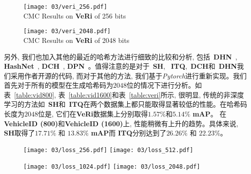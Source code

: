   \begin{figure}[!htp]
    \centering
    \texttt{[image: 03/veri\_256.pdf]} \\
    {CMC Results on \textbf{VeRi} of 256 bits}
   \label{fig:veri256}
  \end{figure}
  \begin{figure}[!htp]
    \centering
    \texttt{[image: 03/veri\_2048.pdf]} \\
    {CMC Results on \textbf{VeRi} of 2048 bits}
   \label{fig:veri2048}
  \end{figure}




另外, 我们也加入其他的最近的哈希方法进行细致的比较和分析, 包括~\textbf{DHN}~\cite{zhu2016deep}, \textbf{HashNet}~\cite{cao2017hashnet}, \textbf{DCH}~\cite{cao2018deep}, \textbf{DPN}~\cite{fan2020deep}。值得注意的是对于~\textbf{SH}, ~\textbf{ITQ},~\textbf{DCH}和~\textbf{DHN}我们采用作者开源的代码, 而对于其他的方法, 我们基于\textit{Pytorch}进行重新实现。我们首先对于所有的模型在生成哈希码为$2048$位的情况下进行分析。如表~\ref{table:vid800}, 表~\ref{table:vid1600}和表~\ref{table:veri}所示, 很明显, 传统的非深度学习的方法如~\textbf{SH}和~\textbf{ITQ}在两个数据集上都只能取得显著较低的性能。在哈希码长度为$2048$位是, 它们在\textbf{VeRi}数据集上分别取得$1.57\%$和$5.14\%$ \textbf{mAP}。 在\textbf{VehicleID (800)}和\textbf{VehicleID (1600)}上, 性能稍微有上升的趋势。具体来说, \textbf{SH}取得了$17.71 \%$ 和 $13.83 \%$ \textbf{mAP}而 \textbf{ITQ}分别达到了$26.26 \%$ 和 $22.23\%$。
\begin{figure}[!htp]
    \centering
    \texttt{[image: 03/loss\_256.pdf]}
    \hspace{1cm}
    \texttt{[image: 03/loss\_512.pdf]}
    \label{fig:losscurve}
  \end{figure}

  \begin{figure}[!htp]
    \centering
    \texttt{[image: 03/loss\_1024.pdf]}
    \hspace{1cm}
    \texttt{[image: 03/loss\_2048.pdf]}
    \label{fig:losscurve1}
  \end{figure}


